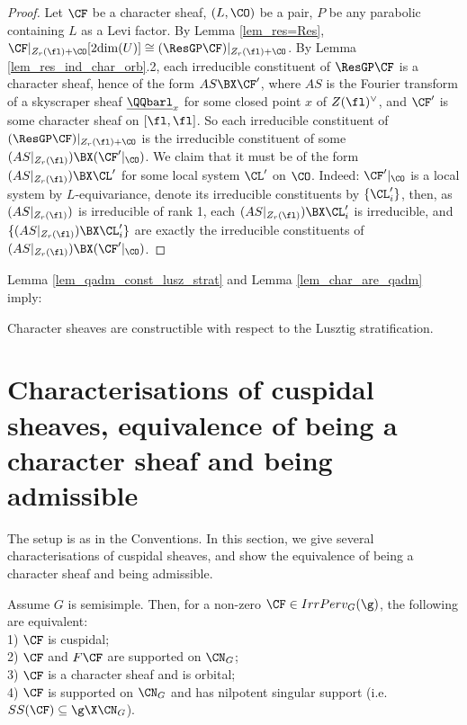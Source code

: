 \begin{proof}
    Let $\CF$ be a character sheaf, $(L,\CO)$ be a pair, $P$ be any parabolic containing $L$ as a Levi factor. By Lemma \ref{lem_res=Res}, $\CF|_{Z_r(\fl)+\CO}[2\mathrm{dim}(U)]\cong (\ResGP\CF)|_{Z_r(\fl)+\CO}$. By Lemma \ref{lem_res_ind_char_orb}.2, each irreducible constituent of $\ResGP\CF$ is a character sheaf, hence of the form $AS\BX\CF'$, where $AS$ is the Fourier transform of a skyscraper sheaf $\underline{\QQbarl}_x$ for some closed point $x$ of $Z(\fl)^{\vee}$, and $\CF'$ is some character sheaf on $[\fl,\fl]$. So each irreducible constituent of $(\ResGP\CF)|_{Z_r(\fl)+\CO}$ is the irreducible constituent of some $(AS|_{Z_r(\fl)})\BX(\CF'|_\CO)$. We claim that it must be of the form $(AS|_{Z_r(\fl)})\BX\CL'$ for some local system $\CL'$ on $\CO$. Indeed: $\CF'|_\CO$ is a local system by $L$-equivariance, denote its irreducible constituents by $\{\CL'_i\}$, then, as $(AS|_{Z_r(\fl)})$ is irreducible of rank 1, each $(AS|_{Z_r(\fl)})\BX\CL'_i$ is irreducible, and $\{(AS|_{Z_r(\fl)})\BX\CL'_i\}$ are exactly the irreducible constituents of $(AS|_{Z_r(\fl)})\BX(\CF'|_\CO)$.

\end{proof}

Lemma \ref{lem_qadm_const_lusz_strat} and Lemma \ref{lem_char_are_qadm} imply:

\begin{corollary}\label{cor_char_const_lusz_strat}
    Character sheaves are constructible with respect to the Lusztig stratification.
\end{corollary}

\section{Characterisations of cuspidal sheaves, equivalence of being a character sheaf and being admissible}\label{sec_characterise_cusp}
The setup is as in the Conventions. In this section, we give several characterisations of cuspidal sheaves, and show the equivalence of being a character sheaf and being admissible.

\begin{theorem}\label{thm_characterise_cusp}
    Assume $G$ is semisimple. Then, for a non-zero $\CF\in IrrPerv_G(\g)$, the following are equivalent:\\
    1) $\CF$ is cuspidal;\\
    2) $\CF$ and $F\CF$ are supported on $\CN_G$;\\
    3) $\CF$ is a character sheaf and is orbital;\\
    4) $\CF$ is supported on $\CN_G$ and has nilpotent singular support (i.e. $SS(\CF)\subseteq \g\X\CN_G$).
\end{theorem}

